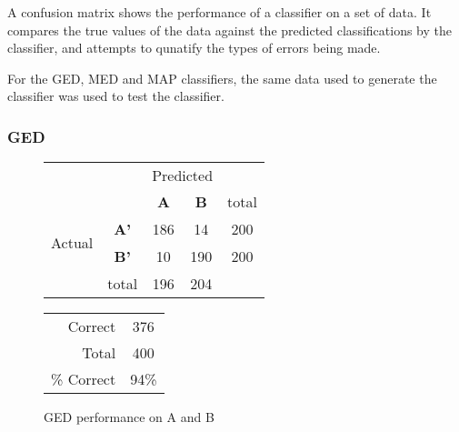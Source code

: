 A confusion matrix shows the performance of a classifier on a set of data. It compares the true values of the data against the predicted classifications by the classifier, and attempts to qunatify the types of errors being made.

For the GED, MED and MAP classifiers, the same data used to generate the classifier was used to test the classifier.

\clearpage

\subsubsection{GED}
\begin{figure}[!ht]
\begin{minipage}[b]{0.5\linewidth}
\centering
	\begin{tabular}{ccc|c|c}
	 & &\multicolumn{2}{c}{Predicted} &\\
	  & & \bf{A} &  \bf{B} & total \\
	 \cline{3-5}
	 \multirow{2}{*}{\begin{sideways}Actual\end{sideways}} & \bf{A'}& 186 & 14 & 200 \\
	 \cline{3-5}
	 & \bf{B'}& 10 & 190 & 200 \\
	  \cline{3-5}
	 &total&196&204&\\
	\end{tabular}
\end{minipage}
\hspace{0.5cm}
\begin{minipage}[b]{0.5\linewidth}
	\begin{tabular}{r|c}
	\hline
	Correct& 376\\
	Total& 400\\
	\hline
	\% Correct& 94\%\\
	\hline
	\end{tabular}
\end{minipage}
\vspace{1mm}
\caption{GED performance on A and B}
\end{figure}

